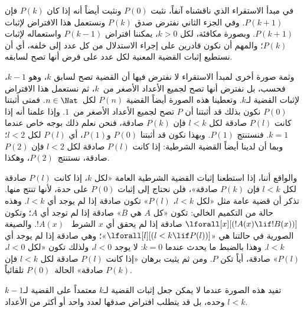 \documentclass[../../../include/open-logic-section]{subfiles}
\begin{document}


في مبدأ الاستقراء الذي ناقشناه آنفاً، نثبت $P(0)$ ونثبت أيضاً أنه إذا
كان $P(k)$ فإن $P(k+1)$. وفي الجزء الثاني نفترض صدق $P(k)$ ونستعمل هذا
الافتراض لإثبات $P(k+1)$. وبصورة مكافئة، لكل $k>0$، يمكننا افتراض
$P(k-1)$ واستعماله لإثبات $P(k)$؛ والمهم أن نكون قادرين على إجراء
الاستدلال من كل عدد إلى خلفه، أي أن نستطيع إثبات القضية المعنية لكل عدد
على فرض أنها تصح لسابقه.

وثمة صورة أخرى لمبدأ الاستقراء لا نفترض فيها أن القضية تصح لسابق $k$،
وهو $k-1$، فحسب، بل نفترض أنها تصح لجميع الأعداد الأصغر من~$k$، ثم
نستعمل هذا الافتراض لإثبات القضية لـ$k$. وتعطينا هذه الصورة أيضاً
القضية $P(n)$ لكل~$n \in \Nat$. فمتى أثبتنا $P(0)$ نكون بذلك قد
أثبتنا أن $P$ تصح لجميع الأعداد الأصغر من~$1$. وإذا علمنا أنه إذا كانت
$P(l)$ صادقة لكل $l<k$ فإن $P(k)$ صادقة، فنحن نعلم ذلك بوجه خاص عندما
$k=1$. فنستنتج $P(1)$. وبهذا نكون قد أثبتنا $P(0)$ و$P(1)$، أي
$P(l)$ لكل $l<2$؛ وبما أن لدينا أيضاً القضية الشرطية: إذا كانت $P(l)$
صادقة لكل $l<2$ فإن $P(2)$ صادقة، نستنتج~$P(2)$، وهكذا.

والواقع أننا، إذا استطعنا إثبات القضية الشرطية العامة «لكل $k$، إذا
كانت $P(l)$ صادقة لكل $l<k$ فإن $P(k)$ صادقة»، فلن نحتاج إلى إثبات
$P(0)$ على حدة، لأنها تنتج منها. تذكر أن قضية عامة مثل «لكل $l<k$،
$P(l)$» تكون صادقة إذا لم يوجد أي $l<k$. وهذه حالة من التكميم الخالي:
تكون «كل $A$ هي $B$» صادقة إذا لم توجد أي $A$؛ وتكون
$\lforall[x][(!A(x) \lif !B(x))]$ صادقة إذا لم يحقق أي $x$ الشرط
~$!A(x)$. والصيغة الصورية في حالتنا هي
«$\lforall[l][(l < k \lif P(l))]$»؛ وهي صادقة إذا لم يوجد أي
$l < k$. وهذا بالضبط ما يحدث عندما $k=0$: لا يوجد $l<0$، ولذلك تكون
«لكل $l<0$، $P(l)$» صادقة، أياً تكن $P$. ومن ثم يثبت برهان «إذا كانت
$P(l)$ صادقة لكل $l<k$ فإن $P(k)$ صادقة» الحالة~$P(0)$ تلقائياً.

تفيد هذه الصورة عندما لا يمكن جعل إثبات القضية لـ$k$ معتمداً على
القضية لـ$k-1$ وحده، بل قد يتطلب افتراض صدقها لعدد واحد أو أكثر من
الأعداد $l<k$.
\end{document}
